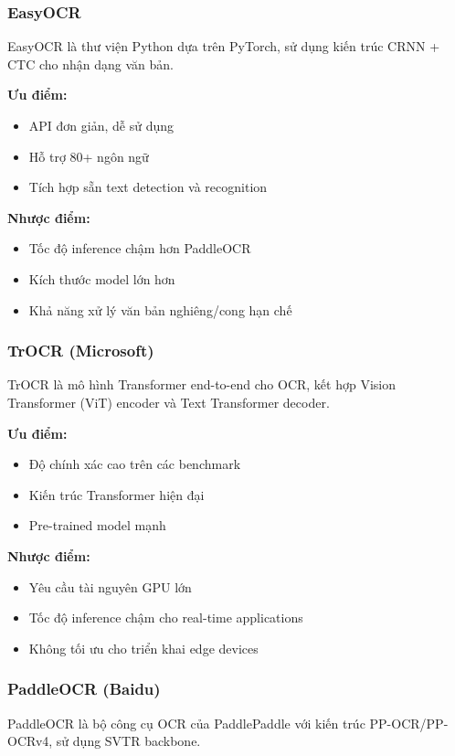 \subsubsection{EasyOCR}
EasyOCR \cite{easyocr2020} là thư viện Python dựa trên PyTorch, sử dụng kiến trúc CRNN + CTC cho nhận dạng văn bản.

\textbf{Ưu điểm:}
\begin{itemize}
    \item API đơn giản, dễ sử dụng
    \item Hỗ trợ 80+ ngôn ngữ
    \item Tích hợp sẵn text detection và recognition
\end{itemize}

\textbf{Nhược điểm:}
\begin{itemize}
    \item Tốc độ inference chậm hơn PaddleOCR
    \item Kích thước model lớn hơn
    \item Khả năng xử lý văn bản nghiêng/cong hạn chế
\end{itemize}

\subsubsection{TrOCR (Microsoft)}
TrOCR \cite{li2021trocr} là mô hình Transformer end-to-end cho OCR, kết hợp Vision Transformer (ViT) encoder và Text Transformer decoder.

\textbf{Ưu điểm:}
\begin{itemize}
    \item Độ chính xác cao trên các benchmark
    \item Kiến trúc Transformer hiện đại
    \item Pre-trained model mạnh
\end{itemize}

\textbf{Nhược điểm:}
\begin{itemize}
    \item Yêu cầu tài nguyên GPU lớn
    \item Tốc độ inference chậm cho real-time applications
    \item Không tối ưu cho triển khai edge devices
\end{itemize}

\subsubsection{PaddleOCR (Baidu)}
PaddleOCR \cite{du2020pp} là bộ công cụ OCR của PaddlePaddle với kiến trúc PP-OCR/PP-OCRv4, sử dụng SVTR backbone.

